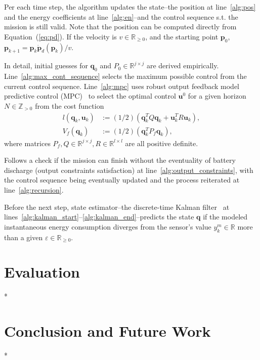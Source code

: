 \documentclass[letterpaper,10pt,conference]{ieeeconf}
\theoremstyle{definition}
\begin{document}
Per each time step, the algorithm updates the state--the position at line~\ref{alg:pos} and the energy coefficients at line~\ref{alg:en}--and the control sequence s.t. the mission is still valid. Note that the position can be computed directly from Equation~(\ref{eq:pd}). If the velocity is $v\in\mathbb{R}_{\geq 0}$, and the starting point $\mathbf{p}_0$, $\mathbf{p}_{k+1}=\mathbf{p}_k\dot{\mathbf{p}}_d(\mathbf{p}_k)/v$.
  
In detail, initial guesses for $\mathbf{q}_0$ and $P_0\in\mathbb{R}^{j\times j}$ are derived empirically. Line~\ref{alg:max_cont_sequence} selects the maximum possible control from the current control sequence. Line~\ref{alg:mpc} uses robust output feedback model predictive control (MPC)~\cite{rawlings2017model} to select the optimal control $\mathbf{u}^0$ for a given horizon $N\in\mathbb{Z}_{>0}$ from the cost function
\begin{equation}\begin{split}
  l(\mathbf{q}_k,\mathbf{u}_k)&:=(1/2)(\mathbf{q}_k^TQ\mathbf{q}_k+\mathbf{u}_k^TR\mathbf{u}_k),\\
  V_f(\mathbf{q}_k)&:=(1/2)(\mathbf{q}_k^TP_f\mathbf{q}_k),
\end{split}\end{equation}
where matrices $P_f,Q\in\mathbb{R}^{j\times j},R\in\mathbb{R}^{l\times l}$ are all positive definite.

Follows a check if the mission can finish without the eventuality of battery discharge (output constraints satisfaction) at line~\ref{alg:output_constraints}, with the control sequence being eventually updated and the process reiterated at line~\ref{alg:recursion}.

Before the next step, state estimator--the discrete-time Kalman filter~\cite{simon2006optimal} at lines~\ref{alg:kalman_start}--\ref{alg:kalman_end}--predicts the state $\mathbf{q}$ if the modeled instantaneous energy consumption diverges from the sensor's value $y_k^m\in\mathbb{R}$ more than a given $\varepsilon\in\mathbb{R}_{\geq  0}$. 


\section{Evaluation}
\label{sec:experimental}

*

\section{Conclusion and Future Work}
\label{sec:conclusion}

*


 
\vspace{0.1ex}

\newpage
\end{document}
